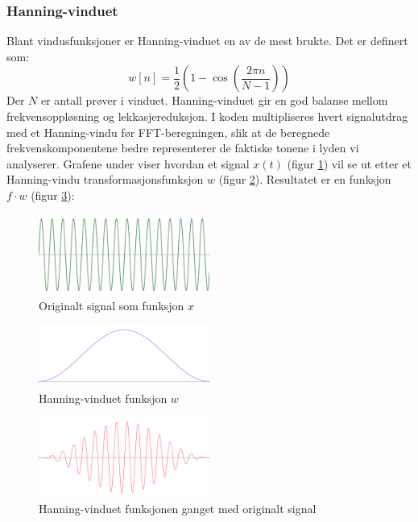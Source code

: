 \subsubsection{Hanning-vinduet}
Blant vindusfunksjoner er Hanning-vinduet en av de mest brukte. Det er definert som:
\begin{equation}
    w[n]=\frac{1}{2} \left( 1 - \cos{\left( \frac{2 \pi n}{N - 1}\right)} \right)
    \label{eq:HanningVinduFunksjon}
\end{equation}
Der $N$ er antall prøver i vinduet. 
Hanning-vinduet gir en god balanse mellom frekvensoppløsning og lekkasjereduksjon. 
I koden multipliseres hvert signalutdrag med et Hanning-vindu før FFT-beregningen, slik at de beregnede frekvenskomponentene bedre representerer de faktiske tonene i lyden vi analyserer. Grafene under viser hvordan et signal $x(t)$ (figur \ref{fig:org_signal}) vil se ut etter et Hanning-vindu transformasjonsfunksjon $w$ (figur \ref{fig:window_func2}). Resultatet er en funksjon $f \cdot w$ (figur \ref{fig:windowed_signal}):

\begin{figure}[h!]
    \centering
    \includegraphics[width=0.5\textwidth]{./Media/org_signal.png}
    \caption{Originalt signal som funksjon $x$}
    \label{fig:org_signal}
\end{figure}
\begin{figure}[h!]
    \centering
    \includegraphics[width=0.5\textwidth]{./Media/window_func.png}
    \caption{Hanning-vinduet funksjon $w$}
    \label{fig:window_func2}
\end{figure}
\begin{figure}[h!]
    \centering
    \includegraphics[width=0.5\textwidth]{./Media/windowd_signal.png}
    \caption{Hanning-vinduet funksjonen ganget med originalt signal}
    \label{fig:windowed_signal}
\end{figure}

